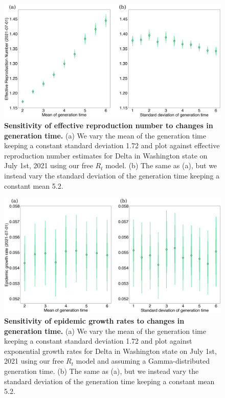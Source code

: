 \documentclass[11pt,oneside,letterpaper]{article}
\begin{document}
\begin{figure}
  \centering
  \includegraphics[width=\linewidth]{figs/generation_time_sensitivity.png}
  \caption{\textbf{Sensitivity of effective reproduction number to changes in generation time.} 
(a) We vary the mean of the generation time keeping a constant standard deviation 1.72 and plot against effective reproduction number estimates for Delta in Washington state on July 1st, 2021 using our free $R_{t}$ model.
(b) The same as (a), but we instead vary the standard deviation of the generation time keeping a constant mean 5.2.}%
  \label{fig:generation_time_sensitivity}
\end{figure}

\begin{figure}
  \centering
  \includegraphics[width=\linewidth]{figs/little_r_sensitivity.png}
  \caption{\textbf{Sensitivity of epidemic growth rates to changes in generation time.} 
(a) We vary the mean of the generation time keeping a constant standard deviation 1.72 and plot against exponential growth rates for Delta in Washington state on July 1st, 2021 using our free $R_{t}$ model and assuming a Gamma-distributed generation time.
(b) The same as (a), but we instead vary the standard deviation of the generation time keeping a constant mean 5.2. }%
  \label{fig:little_r_sensitivity}
\end{figure}
\end{document}
